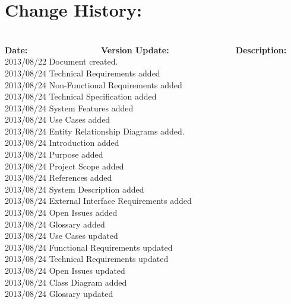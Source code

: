 \documentclass[29pt,a4paper]{moderncv}
\begin{document}
\section{\textbf{Change History:}}
\begin{tabbing}
\\\textbf{Date:} ~~~~~~~~~~~~~~~~~\= \textbf{Version Update:}~~~~~~~~~~~~~~~~\= \textbf{Description:}\\
2013/08/22 \> Document created.\\
2013/08/24  \> Technical Requirements added\\
2013/08/24  \> Non-Functional Requirements added\\
2013/08/24  \> Technical Specification added\\
2013/08/24  \> System Features added\\
2013/08/24  \> Use Cases added\\
2013/08/24  \> Entity Relationship Diagrams added.  \\
2013/08/24  \> Introduction added  \\
2013/08/24  \> Purpose added  \\
2013/08/24  \> Project Scope added  \\
2013/08/24  \> References added  \\
2013/08/24  \> System Description added  \\
2013/08/24  \> External Interface Requirements added  \\
2013/08/24  \> Open Issues added  \\
2013/08/24  \> Glossary added  \\
2013/08/24  \> Use Cases updated  \\
2013/08/24  \> Functional Requirements updated  \\
2013/08/24  \> Technical Requirements updated  \\
2013/08/24  \> Open Issues updated  \\
2013/08/24  \> Class Diagram added  \\
2013/08/24  \> Glossary updated  \\
\end{tabbing}


\newpage
\end{document}
